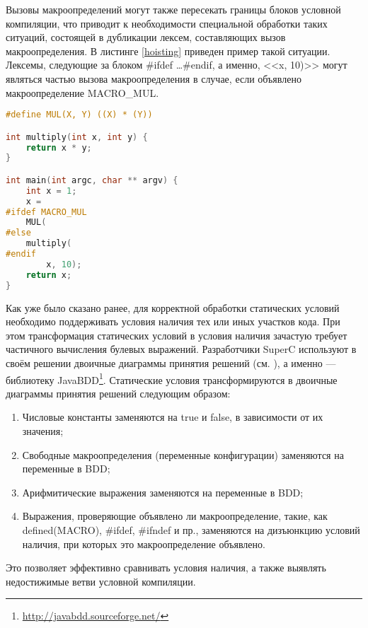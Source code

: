 Вызовы макроопределений могут также пересекать границы блоков условной компиляции, что приводит к необходимости специальной обработки таких ситуаций, состоящей в дубликации лексем, составляющих вызов макроопределения. В листинге \ref{hoisting} приведен пример такой ситуации. Лексемы, следующие за блоком \#ifdef \dots \#endif, а именно, <<x, 10)>> могут являться частью вызова макроопределения в случае, если объявлено макроопределение MACRO\_MUL.

\begin{minipage}{\linewidth}
\begin{lstlisting}[caption={Вызов макроопределения пересекает границу блока условной компиляции},language=C,label=hoisting]
#define MUL(X, Y) ((X) * (Y))

int multiply(int x, int y) {
	return x * y;
}

int main(int argc, char ** argv) {
	int x = 1;
	x =
#ifdef MACRO_MUL
	MUL(
#else
	multiply(
#endif
		x, 10);
	return x;	
}
\end{lstlisting}
\end{minipage}

Как уже было сказано ранее, для корректной обработки статических условий необходимо поддерживать условия наличия тех или иных участков кода. При этом трансформация статических условий в условия наличия зачастую требует частичного вычисления булевых выражений. Разработчики SuperC используют в своём решении двоичные диаграммы принятия решений (см. \cite{bdd}), а именно --- библиотеку JavaBDD\footnote{\url{http://javabdd.sourceforge.net/}}. Статические условия трансформируются в двоичные диаграммы принятия решений следующим образом:

\begin{enumerate}
\item Числовые константы заменяются на true и false, в зависимости от их значения;
\item Свободные макроопределения (переменные конфигурации) заменяются на переменные в BDD;
\item Арифмитические выражения заменяются на переменные в BDD;
\item Выражения, проверяющие объявлено ли макроопределение, такие, как  defined(MACRO), \#ifdef, \#ifndef и пр., заменяются на дизъюнкцию условий наличия, при которых это макроопределение объявлено.
\end{enumerate}

Это позволяет эффективно сравнивать условия наличия, а также выявлять недостижимые ветви условной компиляции.
 

